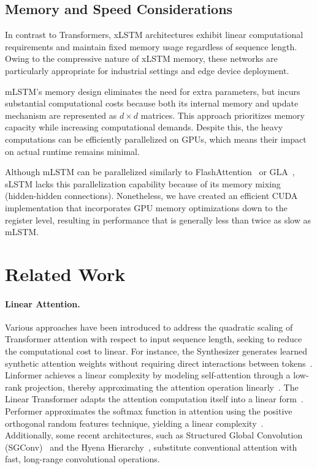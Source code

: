 \subsection{Memory and Speed Considerations}

In contrast to Transformers, xLSTM architectures exhibit linear computational requirements and maintain fixed memory usage regardless of sequence length. Owing to the compressive nature of xLSTM memory, these networks are particularly appropriate for industrial settings and edge device deployment.

mLSTM’s memory design eliminates the need for extra parameters, but incurs substantial computational costs because both its internal memory and update mechanism are represented as $d \times d$ matrices. This approach prioritizes memory capacity while increasing computational demands. Despite this, the heavy computations can be efficiently parallelized on GPUs, which means their impact on actual runtime remains minimal.

Although mLSTM can be parallelized similarly to FlashAttention~\citep{Dao:22,Dao:23} or GLA~\citep{Yang:23arxiv}, sLSTM lacks this parallelization capability because of its memory mixing (hidden-hidden connections). Nonetheless, we have created an efficient CUDA implementation that incorporates GPU memory optimizations down to the register level, resulting in performance that is generally less than twice as slow as mLSTM.

\section{Related Work}
\label{sec:related}

\paragraph{Linear Attention.} Various approaches have been introduced to address the quadratic scaling of Transformer attention with respect to input sequence length, seeking to reduce the computational cost to linear. For instance, the Synthesizer generates learned synthetic attention weights without requiring direct interactions between tokens~\citep{Tay:20arxiv}. Linformer achieves a linear complexity by modeling self-attention through a low-rank projection, thereby approximating the attention operation linearly~\citep{Wang:20arxiv}. The Linear Transformer adapts the attention computation itself into a linear form~\citep{Katharopoulos:20}. Performer approximates the softmax function in attention using the positive orthogonal random features technique, yielding a linear complexity~\citep{Choromanski:21}. Additionally, some recent architectures, such as Structured Global Convolution (SGConv)~\citep{Li:22} and the Hyena Hierarchy~\citep{Poli:23}, substitute conventional attention with fast, long-range convolutional operations.

